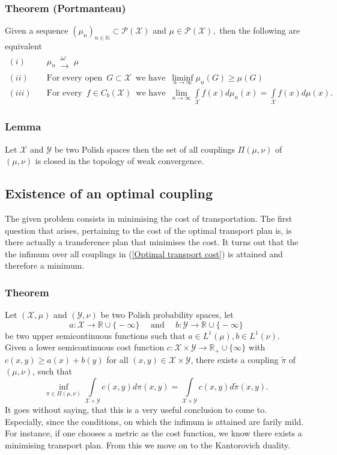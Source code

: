 \documentclass[11pt,a4paper]{article}
\begin{document}
\subsubsection{Theorem (Portmanteau)}
Given a sequence $(\mu_n)_{n\in\mathbb{N}}\subset{}\mathcal{P(X)}$ and $\mu\in{}\mathcal{P(X)},$ then the following are equivalent\\
\begin{align*}
(i)&\hspace{1em}\mu_n\,\substack{\omega \\ \longrightarrow}\,\mu \\[10pt]
(ii)&\hspace{1em}\text{For every open }\, G\subset\mathcal{X} \,\text{ we have }\,\liminf\limits_{n\rightarrow\infty}\mu_n(G)\geq\mu(G)\\
(iii)&\hspace{1em}\text{For every }\, f\in{}C_b(\mathcal{X})\,\text{ we have }\,\lim\limits_{n\rightarrow\infty}\int\limits_{\mathcal{X}}f(x)d\mu_n(x) = \int\limits_{\mathcal{X}}f(x)d\mu(x).
\end{align*}   
\subsubsection{Lemma}
Let $\mathcal{X}$ and $\mathcal{Y}$ be two Polish spaces then the set of all couplings $\Pi(\mu,\nu)$ of $(\mu,\nu)$ is closed in the topology of weak convergence. 
\subsection{Existence of an optimal coupling}
The given problem consists in minimising the cost of transportation. The first question that arises, pertaining to the cost of the optimal transport plan is, is there actually a transference plan that minimises the cost. It turns out that the the infimum over all couplings in (\ref{Optimal transport cost}) is attained and therefore a minimum.
\subsubsection{Theorem}
Let $(\mathcal{X},\mu)$ and $(\mathcal{Y},\nu)$ be two Polish probability spaces, let 
\[
a:\mathcal{X}\rightarrow\mathbb{R}\cup\lbrace{}-\infty\rbrace \quad\text{ and }\quad b:\mathcal{Y}\rightarrow\mathbb{R}\cup\lbrace{}-\infty\rbrace
\]
be two upper semicontinuous functions such that $a\in{}L^1(\mu),b\in{}L^1(\nu).$ \vspace{1em}\\
Given a lower semicontinuous cost function $c:\mathcal{X\times{}Y}\rightarrow\mathbb{R}_{+}\cup\lbrace\infty\rbrace$ with $c(x,y)\geq{}a(x)+b(y)$ for all $(x,y)\in\mathcal{X\times{}Y}$, there exists a coupling $\tilde{\pi}$ of $(\mu,\nu)$, such that
\[
\inf\limits_{\pi\in\Pi(\mu,\nu)}\int\limits_{\mathcal{X\times{}Y}}c(x,y)d\pi(x,y) = \int\limits_{\mathcal{X\times{}Y}}c(x,y)d\tilde{\pi}(x,y).
\]
It goes without saying, that this is a very useful conclusion to come to. Especially, since the conditions, on which the infimum is attained are farily mild. For instance, if one chooses a metric as the cost function, we know there exists a minimising transport plan. 
From this we move on to the Kantorovich duality.
\end{document}
